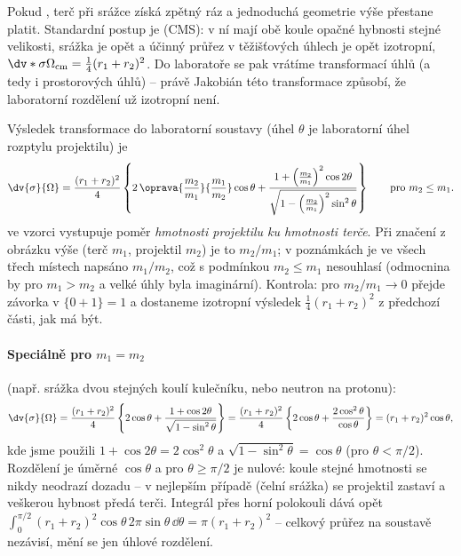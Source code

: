 Pokud , terč při srážce získá zpětný ráz a jednoduchá geometrie výše přestane platit. Standardní postup je  (CMS): v ní mají obě koule opačné hybnosti stejné velikosti, srážka je opět  a účinný průřez v těžišťových úhlech je opět izotropní, $\dv*{\sigma}{\Omega_{\mathrm{cm}}} = \frac14(r_1+r_2)^2$. Do laboratoře se pak vrátíme transformací úhlů (a tedy i prostorových úhlů) -- právě Jakobián této transformace způsobí, že laboratorní rozdělení už izotropní není.

\begin{center}
\end{center}

Výsledek transformace do laboratorní soustavy (úhel $\theta$ je laboratorní úhel rozptylu projektilu) je
\begin{equation}
  \dv{\sigma}{\Omega} = \frac{(r_1+r_2)^2}{4}\left\{ 2\,\oprava{\frac{m_2}{m_1}}{\frac{m_1}{m_2}}\cos\theta + \frac{1+\left(\frac{m_2}{m_1}\right)^2\cos 2\theta}{\sqrt{1-\left(\frac{m_2}{m_1}\right)^2\sin^2\theta}}\right\}
  \qquad\text{pro } m_2 \le m_1 .
\end{equation}
 ve vzorci vystupuje poměr \emph{hmotnosti projektilu ku hmotnosti terče}. Při značení z obrázku výše (terč $m_1$, projektil $m_2$) je to $m_2/m_1$; v poznámkách je ve všech třech místech napsáno $m_1/m_2$, což s podmínkou $m_2\le m_1$ nesouhlasí (odmocnina by pro $m_1>m_2$ a velké úhly byla imaginární). Kontrola: pro $m_2/m_1\to 0$ přejde závorka v $\{0 + 1\} = 1$ a dostaneme izotropní výsledek $\frac14(r_1+r_2)^2$ z předchozí části, jak má být.

\paragraph{Speciálně pro $m_1 = m_2$} (např. srážka dvou stejných koulí kulečníku, nebo neutron na protonu):
\begin{equation}
  \dv{\sigma}{\Omega} = \frac{(r_1+r_2)^2}{4}\left\{2\cos\theta + \frac{1+\cos 2\theta}{\sqrt{1-\sin^2\theta}}\right\}
  = \frac{(r_1+r_2)^2}{4}\left\{2\cos\theta + \frac{2\cos^2\theta}{\cos\theta}\right\}
  = (r_1+r_2)^2\cos\theta ,
\end{equation}
kde jsme použili $1+\cos2\theta = 2\cos^2\theta$ a $\sqrt{1-\sin^2\theta} = \cos\theta$ (pro $\theta<\pi/2$). Rozdělení je úměrné $\cos\theta$ a pro $\theta \ge \pi/2$ je nulové: koule stejné hmotnosti se nikdy neodrazí dozadu -- v nejlepším případě (čelní srážka) se projektil zastaví a veškerou hybnost předá terči. Integrál přes horní polokouli dává opět $\int_0^{\pi/2}(r_1+r_2)^2\cos\theta\,2\pi\sin\theta\,\dd\theta = \pi(r_1+r_2)^2$ -- celkový průřez na soustavě nezávisí, mění se jen úhlové rozdělení.

